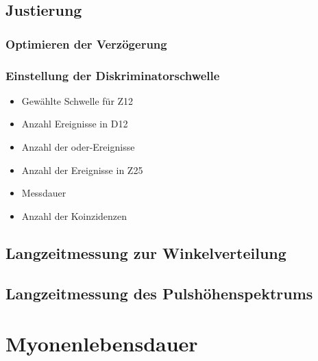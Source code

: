 \documentclass[11pt, ngerman, fleqn, DIV=15, headinclude, BCOR=2cm]{scrreprt}
\begin{document}
\section{Justierung}

\subsection{Optimieren der Verzögerung}
\label{sec:optimieren_verzoegerung}

\subsection{Einstellung der Diskriminatorschwelle}
\label{sec:einstellung_diskriminatorschwelle}

\begin{itemize}
    \item
        Gewählte Schwelle für Z12

    \item
        Anzahl Ereignisse in D12

    \item
        Anzahl der oder-Ereignisse

    \item
        Anzahl der Ereignisse in Z25

    \item
        Messdauer

    \item
        Anzahl der Koinzidenzen
\end{itemize}


\section{Langzeitmessung zur Winkelverteilung}
\label{sec:langzeit_winkel}

\section{Langzeitmessung des Pulshöhenspektrums}
\label{sec:langzeit_puls}

\chapter{Myonenlebensdauer}
\end{document}
